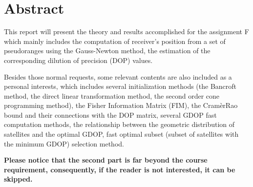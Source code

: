\chapter{Abstract}
This report will present the theory and results accomplished for the assignment F which mainly includes the computation of receiver's position from a set of pseudoranges using the Gauss-Newton method, the estimation of the corresponding dilution of precision (DOP) values.

Besides those normal requests, some relevant contents are also included as a personal interests, which includes several initialization methods (the Bancroft method, the direct linear transformation method, the second order cone programming method), the Fisher Information Matrix (FIM), the Cram\`erRao bound and their connections with the DOP matrix, several GDOP fast computation methods, the relationship between the geometric distribution of satellites and the optimal GDOP, fast optimal subset (subset of satellites with the minimum GDOP) selection method.

\textbf{Please notice that the second part is far beyond the course requirement, consequently, if the reader is not interested, it can be skipped.}

